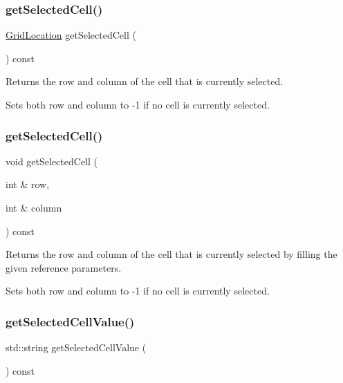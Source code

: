 \subsubsection{\texorpdfstring{get\+Selected\+Cell()}{getSelectedCell()}\hspace{0.1cm}{\footnotesize\ttfamily [1/2]}}
{\footnotesize\ttfamily \mbox{\hyperlink{structGridLocation}{Grid\+Location}} get\+Selected\+Cell (\begin{DoxyParamCaption}{ }\end{DoxyParamCaption}) const\hspace{0.3cm}{\ttfamily [virtual]}}



Returns the row and column of the cell that is currently selected. 

Sets both row and column to -\/1 if no cell is currently selected. \mbox{\label{classGTable_a29b4e2e079037922545996e08f7ce6c4}} 
\subsubsection{\texorpdfstring{get\+Selected\+Cell()}{getSelectedCell()}\hspace{0.1cm}{\footnotesize\ttfamily [2/2]}}
{\footnotesize\ttfamily void get\+Selected\+Cell (\begin{DoxyParamCaption}\item[{int \&}]{row,  }\item[{int \&}]{column }\end{DoxyParamCaption}) const\hspace{0.3cm}{\ttfamily [virtual]}}



Returns the row and column of the cell that is currently selected by filling the given reference parameters. 

Sets both row and column to -\/1 if no cell is currently selected. \mbox{\label{classGTable_a8963c035a687a8393cd1f56ae05f582e}} 
\subsubsection{\texorpdfstring{get\+Selected\+Cell\+Value()}{getSelectedCellValue()}}
{\footnotesize\ttfamily std\+::string get\+Selected\+Cell\+Value (\begin{DoxyParamCaption}{ }\end{DoxyParamCaption}) const\hspace{0.3cm}{\ttfamily [virtual]}}



